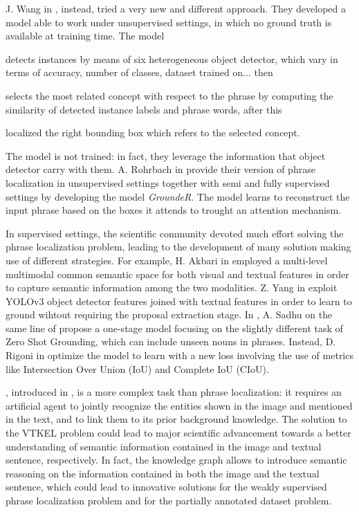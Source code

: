 J. Wang in \etal{} , instead, tried a very new
and different approach. They developed a model able to work under
unsupervised settings, in which no ground truth is available at
training time. The model 
\begin{enumerate*}[label=(\roman*)] 
    \item detects instances by means of six heterogeneous object
    detector, which vary in terms of accuracy, number of classes,
    dataset trained on... then
    \item selects the most related concept with respect to the phrase
    by computing the similarity of detected instance labels and phrase
    words, after this
    \item localized the right bounding box which refers to the
    selected concept.
\end{enumerate*}
The model is not trained: in fact, they leverage the information that
object detector carry with them. A. Rohrbach \etal{} in  provide their version of phrase localization in
unsupervised settings together with semi and fully supervised settings
by developing the model \textit{GroundeR}. The model learns to
reconstruct the input phrase based on the boxes it attends to trought
an attention mechanism. 

In supervised settings, the scientific community devoted much effort
solving the phrase localization problem, leading to the development of
many solution making use of different strategies. For example, H.
Akbari \etal{} in  employed a
multi-level multimodal common semantic space for both visual and
textual features in order to capture semantic information among the
two modalities. Z. Yang \etal{} in  exploit YOLOv3 object detector features joined with textual
features in order to learn to ground wihtout requiring the proposal
extraction stage. In , A. Sadhu \etal{}
on the same line of  propose
a one-stage model focusing on the slightly different task of Zero Shot
Grounding, which can include unseen nouns in phrases. Instead, D.
Rigoni \etal{} in  optimize the model to
learn with a new loss involving the use of metrics like Intersection
Over Union (IoU) and Complete IoU (CIoU).

, introduced in
, is a more complex task than phrase
localization: it requires an artificial agent to jointly recognize the
entities shown in the image and mentioned in the text, and to link
them to its prior background knowledge. The solution to the VTKEL
problem could lead to major scientific advancement towards a better
understanding of semantic information contained in the image and
textual sentence, respectively. In fact, the knowledge graph allows to
introduce semantic reasoning on the information contained in both the
image and the textual sentence, which could lead to innovative
solutions for the weakly supervised phrase localization problem and
for the partially annotated dataset problem.


